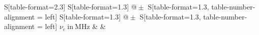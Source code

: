 \begin{table}
    \centering
    \caption{Frequenzen $\nu_e$ und dazugehörige erdmagnetfeld-bereinigte Flussdichten $B$ der Helmholtz-Spulen, sowie das berechnete Erdmagnetfeld $B_\text{Erde}$}
    \label{tab:BFeld}
    \begin{tabular}{
	S[table-format=2.3]
	S[table-format=1.3]
	@{${}\pm{}$}
	S[table-format=1.3, table-number-alignment = left]
	S[table-format=1.3]
	@{${}\pm{}$}
	S[table-format=1.3, table-number-alignment = left]
	}
	\toprule
	{$\nu_e \ \mathrm{in} \ \si{\mega\hertz}$}		& 		& 
			\\ 
	\midrule
    
    \bottomrule
    \end{tabular}
    \end{table}
